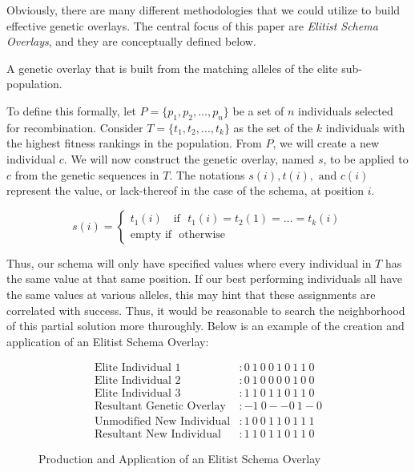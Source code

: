 Obviously, there are many different methodologies that we could utilize to build effective genetic overlays. The central focus of this paper are \emph{Elitist Schema Overlays}, and they are conceptually defined below.

\begin{eschema}
A genetic overlay that is built from the matching alleles of the elite sub-population.
\end{eschema}

To define this formally, let $P = \{p_1,p_2,\ldots,p_n\}$ be a set of $n$ individuals selected for recombination. Consider $T=\{t_1,t_2,\ldots,t_k\}$ as the set of the $k$ individuals with the highest fitness rankings in the population. From $P$, we will create a new individual $c$.  We will now construct the genetic overlay, named $s$, to be applied to $c$ from the genetic sequences in $T$. The notations $s(i), t(i), \text{ and } c(i)$ represent the value, or lack-thereof in the case of the schema, at position $i$.
 
 \begin{displaymath}
   s(i) = \left\{
     \begin{array}{lr}
       t_1(i) \text{~~~if~ } t_1(i) = t_2(1) = \ldots = t_k(i) \\
       \text{empty~} \text{if~ } \text{otherwise} 
     \end{array}
   \right.
\end{displaymath} 

Thus, our schema will only have specified values where every individual in $T$ has the same value at that same position. If our best performing individuals all have the same values at various alleles, this may hint that these assignments are correlated with success. Thus, it would be reasonable to search the neighborhood of this partial solution more thuroughly. Below is an example of the creation and application of an Elitist Schema Overlay:
\begin{figure}[h!]
\centering 
\begin{align*}
\text{Elite Individual 1} &: 0~1~0~0~1~0~1~1~0 			\\
\text{Elite Individual 2} &: 0~1~0~0~0~0~1~0~0 			\\
\text{Elite Individual 3} &: 1~1~0~1~1~0~1~1~0 			\\
\text{Resultant Genetic Overlay} &:   -1~0--0~1-0			\\
\text{Unmodified New Individual} &: 1~0~0~1~1~0~1~1~1	\\		
\text{Resultant New Individual} &: 1~1~0~1~1~0~1~1~0
\end{align*}
\caption{Production and Application of an Elitist Schema Overlay}
\end{figure}

